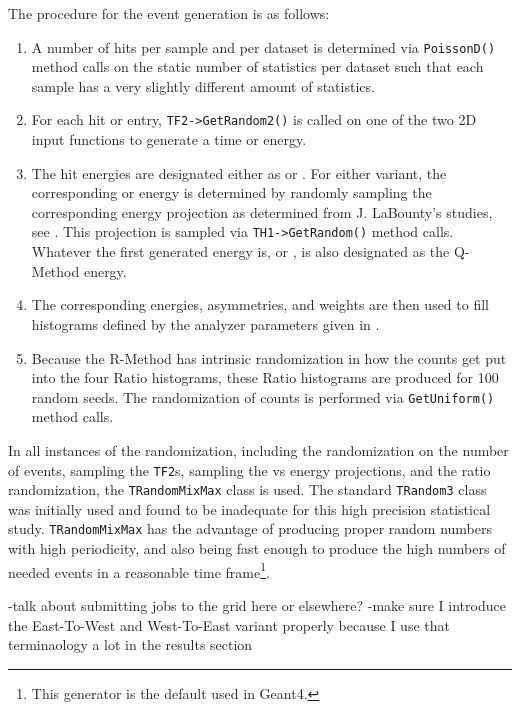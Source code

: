 The procedure for the event generation is as follows:
\begin{enumerate}
	\item{A number of hits per sample and per dataset is determined via \texttt{PoissonD()} method calls on the static number of statistics per dataset such that each sample has a very slightly different amount of statistics.} 
	\item{For each hit or entry, \texttt{TF2->GetRandom2()} is called on one of the two 2D input functions to generate a time or energy.}
	\item{The hit energies are designated either as \RE or \RW. For either variant, the corresponding \RW or \RE energy is determined by randomly sampling the corresponding energy projection as determined from J. LaBounty's studies, see . This projection is sampled via \texttt{TH1->GetRandom()} method calls. Whatever the first generated energy is, \RE or \RW, is also designated as the Q-Method energy.}
	\item{The corresponding energies, asymmetries, and weights are then used to fill histograms defined by the analyzer parameters given in .}
	\item{Because the R-Method has intrinsic randomization in how the counts get put into the four Ratio histograms, these Ratio histograms are produced for 100 random seeds. The randomization of counts is performed via \texttt{GetUniform()} method calls.} 
\end{enumerate}


In all instances of the randomization, including the randomization on the number of events, sampling the \texttt{TF2}s, sampling the \RE vs \RW energy projections, and the ratio randomization, the \ROOT\texttt{TRandomMixMax} class is used. The standard \texttt{TRandom3} class was initially used and found to be inadequate for this high precision statistical study. \texttt{TRandomMixMax} has the advantage of producing proper random numbers with high periodicity, and also being fast enough to produce the high numbers of needed events in a reasonable time frame\footnote{This generator is the default used in Geant4.}\cite{TRandom}.




-talk about submitting jobs to the grid here or elsewhere? 
-make sure I introduce the East-To-West and West-To-East variant properly because I use that terminaology a lot in the results section



